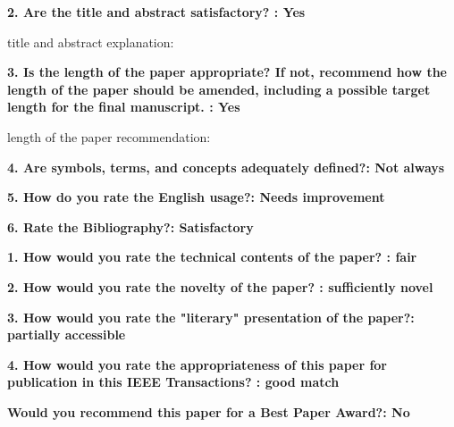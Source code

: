 \documentclass[12pt]{article}
\begin{document}
\textbf{2. Are the title and abstract satisfactory? : Yes}

title and abstract explanation:

\textbf{3. Is the length of the paper appropriate? If not, recommend how the length of the paper should be amended, including a possible target length for the final manuscript. : Yes}

length of the paper recommendation:

\textbf{4. Are symbols, terms, and concepts adequately defined?: Not always}

\textbf{5. How do you rate the English usage?: Needs improvement}

\textbf{6. Rate the Bibliography?: Satisfactory}

\textbf{1. How would you rate the technical contents of the paper? : fair}

\textbf{2. How would you rate the novelty of the paper? : sufficiently novel}

\textbf{3. How would you rate the "literary" presentation of the paper?: partially accessible}

\textbf{4. How would you rate the appropriateness of this paper for publication in this IEEE Transactions? : good match}

\textbf{Would you recommend this paper for a Best Paper Award?: No}
\end{document}
